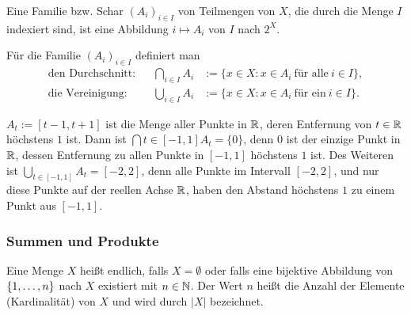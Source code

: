 Eine Familie bzw. Schar  $ (A_i)_{i \in I}$ von Teilmengen von $ X $, die durch die Menge $I$ indexiert sind,  ist eine Abbildung $i \mapsto A_i$ von $I$ nach $2^X$. 

Für die Familie $ (A_i)_{i \in I} $ definiert man
\begin{align*}
	\text{den Durchschnitt:} && \bigcap_{i \in I} A_i &:= \{ x \in X : x \in A_i \:\text{für alle}\: i \in I \},\\
	\text{die Vereinigung:} && \bigcup_{i \in I} A_i &:= \{ x \in X : x \in A_i \:\text{für ein}\: i \in I \}.
\end{align*}

\begin{bsp}
	 $A_t := [t-1,t+1]$ ist die Menge aller Punkte in $\mathbb R$, deren Entfernung von $t \in \mathbb R$ höchstens $1$ ist. Dann ist $\bigcap{t \in [-1,1]} A_t = \{0\}$, denn $0$ ist der einzige Punkt in $\mathbb R$, dessen Entfernung zu allen Punkte in $[-1,1]$ höchstens $1$ ist. Des Weiteren ist $\bigcup_{t \in [-1,1]} A_t = [-2,2]$, denn alle Punkte im Intervall $[-2,2]$, und nur diese Punkte auf der reellen Achse $\mathbb R$, haben den Abstand höchstens $1$ zu einem Punkt aus $[-1,1]$. 
\end{bsp} 


\subsubsection{Summen und Produkte}

Eine Menge $ X $ heißt endlich, falls $ X = \emptyset $ oder falls eine bijektive Abbildung von $ \{ 1,\ldots,n \} $ nach $ X $ existiert mit $ n \in \mathbb N $. Der Wert $ n $ heißt die Anzahl der Elemente (Kardinalität) von $ X $ und wird durch $ |X| $ bezeichnet.

